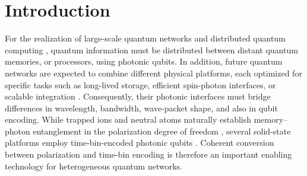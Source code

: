 \documentclass[reprint, superscriptaddress, longbibliography, floatfix, twocolumn, nofootinbib, amsmath, amssymb, aps, showkeys]{revtex4-2}
\begin{document}
\begin{abstract}
A key enabling feature of future quantum networks is interoperability  between platforms that operate at different wavelengths and with different qubit encodings. We demonstrate an interface that converts atom-photon entanglement from polarization encoding at an atomic wavelength to time-bin encoding in the telecom C-band. Atom-entangled photons at 854\,nm are generated from a single $^{40}$Ca$^+$ ion. After quantum frequency conversion to 1550\,nm, the photonic polarization qubit is converted into a time-bin qubit using a fiber-based Mach–Zehnder-like encoder. Full quantum tomography of the final state verifies that the process preserves entanglement with 96.3(4.2)\% fidelity.
Together with the independent work of Ferrari et al.\ [arXiv:2607.07805 (2026)], this is the first demonstration of polarization-to-time-bin conversion of photons entangled with a single atomic quantum memory. The telecom-compatible interface enables robust qubit transmission over optical fibers and provides a key building block for heterogeneous quantum networking architectures.
\end{abstract}


\maketitle
\section{Introduction}
For the realization of large-scale quantum networks \cite{Kimble_2008} and distributed quantum computing \cite{DiVincenzo_2000, Nigmatullin_2016, Jiang_2007, Cirac_1999}, quantum information must be distributed between distant quantum memories, or processors, using photonic qubits. 
In addition, future quantum networks are expected to combine different physical platforms, each optimized for specific tasks such as long-lived storage, efficient spin-photon interfaces, or scalable integration \cite{vanLoock_2020, Wei_2022}. Consequently, their photonic interfaces must bridge differences in wavelength, bandwidth, wave-packet shape, and also in qubit encoding. While trapped ions and neutral atoms naturally establish memory--photon entanglement in the polarization degree of freedom \cite{Bock_2018, vanLeent_2022}, several solid-state platforms employ time-bin-encoded photonic qubits \cite{Jayakumar_2014, Tchebotareva_2019, Knaut_2024}. Coherent conversion between polarization and time-bin encoding is therefore an important enabling technology for heterogeneous quantum networks.
\end{document}
